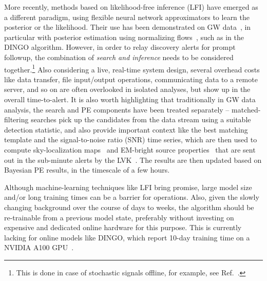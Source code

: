 \begin{refsection}
More recently, methods based on likelihood-free inference (LFI) have emerged as a different paradigm, using flexible neural network approximators to learn the posterior or the likelihood. 
Their use has been demonstrated on GW data~\cite{Gabbard_2021, PhysRevD.108.042004}, in particular with posterior estimation using normalizing flows~\cite{Dax_2021}, such as in the DINGO algorithm. 
However, in order to relay discovery alerts for prompt followup, the combination of \emph{search and inference} needs to be considered together.\footnote{This is done in case of stochastic signals offline, for example, see Ref.~\cite{Smith_2018}.}
Also considering a live, real-time system design, several overhead costs like data transfer, file input/output operations, communicating data to a remote server, and so on are often overlooked in isolated analyses, but show up in the overall time-to-alert.
It is also worth highlighting that traditionally in GW data analysis, the search and PE components have been treated separately -- matched-filtering searches pick up the candidates from the data stream using a suitable detection statistic, and also provide important context like the best matching template and the signal-to-noise ratio (SNR) time series, which are then used to compute sky-localization maps~\cite{Singer_2016} and EM-bright source properties~\cite{Chatterjee:2019avs} that are sent out in the sub-minute alerts by the LVK~\cite{Chaudhary_2024}.
The results are then updated based on Bayesian PE results, in the timescale of a few hours.

Although machine-learning techniques like LFI bring promise, large model size and/or long training times can be a barrier for operations.
Also, given the slowly changing background over the course of days to weeks, the algorithm should be re-trainable from a previous model state, preferably without investing on expensive and dedicated online hardware for this purpose. 
This is currently lacking for online models like DINGO, which report 10-day training time on a NVIDIA A100 GPU~\cite{Dax_2021}.


\end{refsection}
